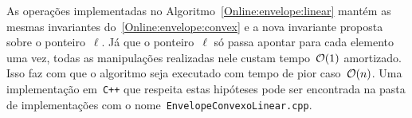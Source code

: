 As operações implementadas no Algoritmo~\ref{Online:envelope:linear} mantém as mesmas invariantes do~\ref{Online:envelope:convex} e a nova invariante proposta sobre o ponteiro~$\ell$. Já que o ponteiro~$\ell$ só passa apontar para cada elemento uma vez, todas as manipulações realizadas nele custam tempo~$\mathcal{O}(1)$ amortizado. Isso faz com que o algoritmo seja executado com tempo de pior caso~$\mathcal{O}(n)$. Uma implementação em~\texttt{C++} que respeita estas hipóteses pode ser encontrada na pasta de implementações com o nome~\texttt{EnvelopeConvexoLinear.cpp}.
